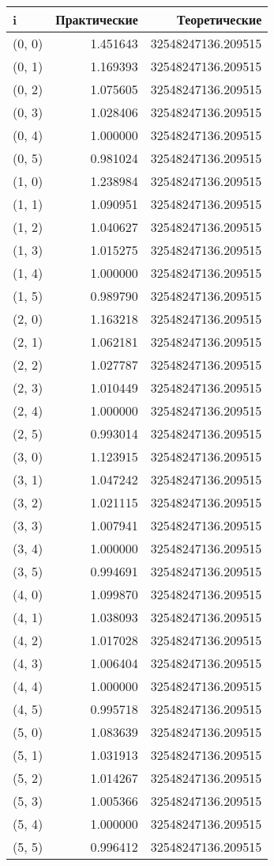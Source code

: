 \begin{tabular}{lrr}
\toprule
i & Практические & Теоретические \\
\midrule
(0, 0) & 1.451643 & 32548247136.209515 \\
(0, 1) & 1.169393 & 32548247136.209515 \\
(0, 2) & 1.075605 & 32548247136.209515 \\
(0, 3) & 1.028406 & 32548247136.209515 \\
(0, 4) & 1.000000 & 32548247136.209515 \\
(0, 5) & 0.981024 & 32548247136.209515 \\
(1, 0) & 1.238984 & 32548247136.209515 \\
(1, 1) & 1.090951 & 32548247136.209515 \\
(1, 2) & 1.040627 & 32548247136.209515 \\
(1, 3) & 1.015275 & 32548247136.209515 \\
(1, 4) & 1.000000 & 32548247136.209515 \\
(1, 5) & 0.989790 & 32548247136.209515 \\
(2, 0) & 1.163218 & 32548247136.209515 \\
(2, 1) & 1.062181 & 32548247136.209515 \\
(2, 2) & 1.027787 & 32548247136.209515 \\
(2, 3) & 1.010449 & 32548247136.209515 \\
(2, 4) & 1.000000 & 32548247136.209515 \\
(2, 5) & 0.993014 & 32548247136.209515 \\
(3, 0) & 1.123915 & 32548247136.209515 \\
(3, 1) & 1.047242 & 32548247136.209515 \\
(3, 2) & 1.021115 & 32548247136.209515 \\
(3, 3) & 1.007941 & 32548247136.209515 \\
(3, 4) & 1.000000 & 32548247136.209515 \\
(3, 5) & 0.994691 & 32548247136.209515 \\
(4, 0) & 1.099870 & 32548247136.209515 \\
(4, 1) & 1.038093 & 32548247136.209515 \\
(4, 2) & 1.017028 & 32548247136.209515 \\
(4, 3) & 1.006404 & 32548247136.209515 \\
(4, 4) & 1.000000 & 32548247136.209515 \\
(4, 5) & 0.995718 & 32548247136.209515 \\
(5, 0) & 1.083639 & 32548247136.209515 \\
(5, 1) & 1.031913 & 32548247136.209515 \\
(5, 2) & 1.014267 & 32548247136.209515 \\
(5, 3) & 1.005366 & 32548247136.209515 \\
(5, 4) & 1.000000 & 32548247136.209515 \\
(5, 5) & 0.996412 & 32548247136.209515 \\
\bottomrule
\end{tabular}
